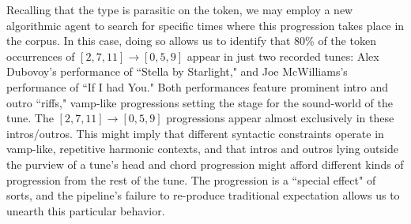 \begin{enumerate}
Recalling that the type is parasitic on the token, we may employ a new algorithmic agent to search for specific times where this progression takes place in the corpus.  In this case, doing so allows us to identify that 80\% of the token occurrences of $[2,7,11] \rightarrow [0,5,9]$ appear in just two recorded tunes: Alex Dubovoy's performance of ``Stella by Starlight," and Joe McWilliams's performance of ``If I had You."  Both performances feature prominent intro and outro ``riffs," vamp-like progressions setting the stage for the sound-world of the tune.  The $[2,7,11] \rightarrow [0,5,9]$ progressions appear almost exclusively in these intros/outros.  This might imply that different syntactic constraints operate in vamp-like, repetitive harmonic contexts, and that intros and outros lying outside the purview of a tune's head and chord progression might afford different kinds of progression from the rest of the tune.  The progression is a ``special effect" of sorts, and the pipeline's failure to re-produce traditional expectation allows us to unearth this particular behavior.


\end{enumerate}
